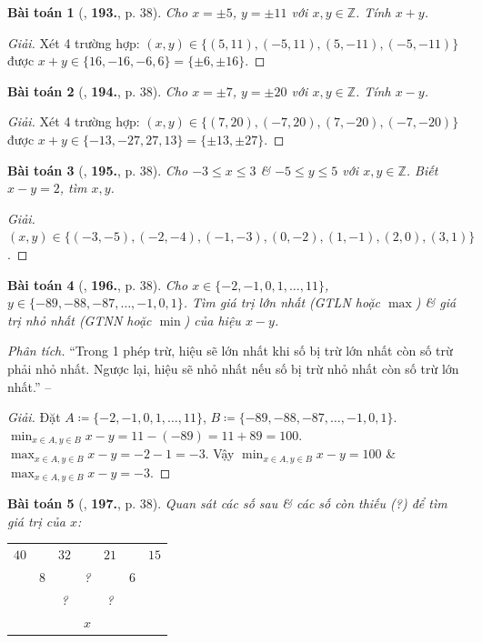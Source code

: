 \documentclass{article}
\numberwithin{equation}{section}
\newtheorem{baitoan}{Bài toán}
\begin{document}
\begin{baitoan}[\cite{Tuyen_Toan_6}, \textbf{193.}, p. 38]
	Cho $x = \pm5$, $y = \pm11$ với $x,y\in\mathbb{Z}$. Tính $x + y$.
\end{baitoan}

\begin{proof}[Giải]
	Xét 4 trường hợp: $(x,y)\in\{(5,11),(-5,11),(5,-11),(-5,-11)\}$ được $x + y\in\{16,-16,-6,6\} = \{\pm6,\pm16\}$.
\end{proof}

\begin{baitoan}[\cite{Tuyen_Toan_6}, \textbf{194.}, p. 38]
	Cho $x = \pm7$, $y = \pm20$ với $x,y\in\mathbb{Z}$. Tính $x - y$.
\end{baitoan}

\begin{proof}[Giải]
	Xét 4 trường hợp: $(x,y)\in\{(7,20),(-7,20),(7,-20),(-7,-20)\}$ được $x + y\in\{-13,-27,27,13\} = \{\pm13,\pm27\}$.
\end{proof}

\begin{baitoan}[\cite{Tuyen_Toan_6}, \textbf{195.}, p. 38]
	Cho $-3\le x\le3$ \& $-5\le y\le5$ với $x,y\in\mathbb{Z}$. Biết $x - y = 2$, tìm $x,y$.
\end{baitoan}

\begin{proof}[Giải]
	$(x,y)\in\{(-3,-5),(-2,-4),(-1,-3),(0,-2),(1,-1),(2,0),(3,1)\}$.
\end{proof}

\begin{baitoan}[\cite{Tuyen_Toan_6}, \textbf{196.}, p. 38]
	Cho $x\in\{-2,-1,0,1,\ldots,11\}$, $y\in\{-89,-88,-87,\ldots,-1,0,1\}$. Tìm giá trị lớn nhất (GTLN hoặc $\max$) \& giá trị nhỏ nhất (GTNN hoặc $\min$) của hiệu $x - y$.
\end{baitoan}
\noindent\textit{Phân tích.} ``Trong 1 phép trừ, hiệu sẽ lớn nhất khi số bị trừ lớn nhất còn số trừ phải nhỏ nhất. Ngược lại, hiệu sẽ nhỏ nhất nếu số bị trừ nhỏ nhất còn số trừ lớn nhất.'' -- \cite[p. 130]{Tuyen_Toan_6}

\begin{proof}[Giải]
	Đặt $A\coloneqq\{-2,-1,0,1,\ldots,11\}$, $B\coloneqq\{-89,-88,-87,\ldots,-1,0,1\}$. $\min_{x\in A,y\in B} x - y = 11 - (-89) = 11 + 89 = 100$. $\max_{x\in A,y\in B} x - y = -2 - 1 = -3$. Vậy $\min_{x\in A,y\in B} x - y = 100$ \& $\max_{x\in A,y\in B} x - y = -3$.
\end{proof}

\begin{baitoan}[\cite{Tuyen_Toan_6}, \textbf{197.}, p. 38]
	Quan sát các số sau \& các số còn thiếu (?) để tìm giá trị của $x$:
	\begin{table}[H]
		\centering
		\begin{tabular}{ccccccc}
			$40$ &  & $32$ &  & $21$ &  &  $15$ \\
			& $8$ &  & ? &  & $6$ &  \\
			&  & ? &  & ? &  &  \\
			&  &  & $x$ &  &  &  \\
		\end{tabular}
	\end{table}
\end{baitoan}
\end{document}
